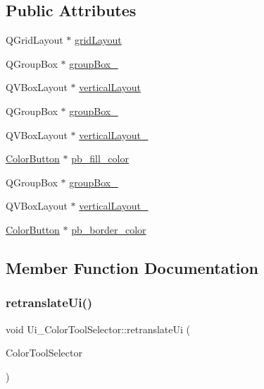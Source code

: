 \subsection*{Public Attributes}
\begin{DoxyCompactItemize}
\item 
Q\+Grid\+Layout $\ast$ \hyperlink{class_ui___color_tool_selector_a2c3286ab8dcdbca7dc2d6e07e2bbed49}{grid\+Layout}
\item 
Q\+Group\+Box $\ast$ \hyperlink{class_ui___color_tool_selector_a97d6fcbf9dbfe3ea8293ccd933bc2264}{group\+Box\+\_}
\item 
Q\+V\+Box\+Layout $\ast$ \hyperlink{class_ui___color_tool_selector_a040c4849172e8f21adbd0c038f343c39}{vertical\+Layout}
\item 
Q\+Group\+Box $\ast$ \hyperlink{class_ui___color_tool_selector_a4564df0b9bd5e8f52e74d4eecedce1f0}{group\+Box\+\_}
\item 
Q\+V\+Box\+Layout $\ast$ \hyperlink{class_ui___color_tool_selector_a3a1b911be3ed700de6315364a61999d9}{vertical\+Layout\+\_}
\item 
\hyperlink{class_color_button}{Color\+Button} $\ast$ \hyperlink{class_ui___color_tool_selector_ad8fc8d84903bdcb9c7600d9690bbae58}{pb\+\_\+fill\+\_\+color}
\item 
Q\+Group\+Box $\ast$ \hyperlink{class_ui___color_tool_selector_a0eec723e0bf3b2d0df2c3c09b57b60f5}{group\+Box\+\_}
\item 
Q\+V\+Box\+Layout $\ast$ \hyperlink{class_ui___color_tool_selector_a20890ac92d7000b22f64b8e9a5a3e703}{vertical\+Layout\+\_}
\item 
\hyperlink{class_color_button}{Color\+Button} $\ast$ \hyperlink{class_ui___color_tool_selector_a2289ac77d2f44f84ff2d28b862bdc2d8}{pb\+\_\+border\+\_\+color}
\end{DoxyCompactItemize}


\subsection{Member Function Documentation}
\mbox{\label{class_ui___color_tool_selector_ac18c0e3964ab075c31dbe5708e5bfa15}} 
\subsubsection{\texorpdfstring{retranslate\+Ui()}{retranslateUi()}}
{\footnotesize\ttfamily void Ui\+\_\+\+Color\+Tool\+Selector\+::retranslate\+Ui (\begin{DoxyParamCaption}\item[{Q\+Widget $\ast$}]{Color\+Tool\+Selector }\end{DoxyParamCaption})\hspace{0.3cm}{\ttfamily [inline]}}

